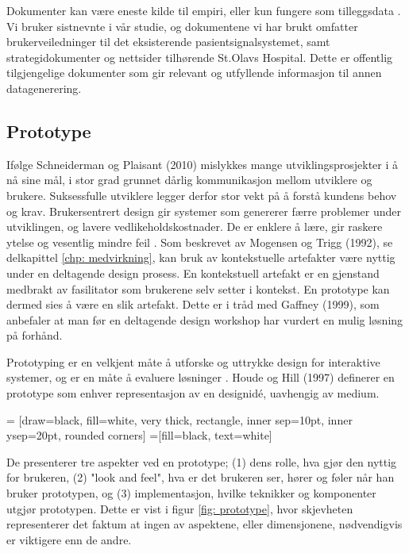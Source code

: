\noindent
Dokumenter kan være eneste kilde til empiri, eller kun fungere som tilleggsdata \cite{Tjora}. Vi bruker sistnevnte i vår studie, og dokumentene vi har brukt omfatter brukerveiledninger til det eksisterende pasientsignalsystemet, samt strategidokumenter og nettsider tilhørende St.Olavs Hospital. Dette er offentlig tilgjengelige dokumenter som gir relevant og utfyllende informasjon til annen datagenerering.

\subsection{Prototype}
Ifølge Schneiderman og Plaisant (2010) mislykkes mange utviklingsprosjekter i å nå sine mål, i stor grad grunnet dårlig kommunikasjon mellom utviklere og brukere. Suksessfulle utviklere legger derfor stor vekt på å forstå kundens behov og krav. 
Brukersentrert design gir systemer som genererer færre problemer under utviklingen, og lavere vedlikeholdskostnader. De er enklere å lære, gir raskere ytelse og vesentlig mindre feil \cite{mmi}.
Som beskrevet av Mogensen og Trigg (1992), se delkapittel \ref{chp: medvirkning}, kan bruk av kontekstuelle artefakter være nyttig under en deltagende design prosess. En kontekstuell artefakt er en gjenstand medbrakt av fasilitator som brukerene selv setter i kontekst. En prototype kan dermed sies å være en slik artefakt. Dette er i tråd med Gaffney (1999), som anbefaler at man før en deltagende design workshop har vurdert en mulig løsning på forhånd.

\noindent
Prototyping er en velkjent måte å utforske og uttrykke design for interaktive systemer, og er en måte å evaluere løsninger \cite{Houde97}. Houde og Hill (1997) definerer en prototype som enhver representasjon av en designidé, uavhengig av medium. 

 = [draw=black, fill=white, very thick,
    rectangle, inner sep=10pt, inner ysep=20pt, rounded corners]
 =[fill=black, text=white]
%

\noindent
De presenterer tre aspekter ved en prototype; (1) dens rolle, hva gjør den nyttig for brukeren, (2) "look and feel", hva er det brukeren ser, hører og føler når han bruker prototypen, og (3) implementasjon, hvilke teknikker og komponenter utgjør prototypen. Dette er vist i figur \ref{fig: prototype}, hvor skjevheten representerer det faktum at ingen av aspektene, eller dimensjonene, nødvendigvis er viktigere enn de andre.

